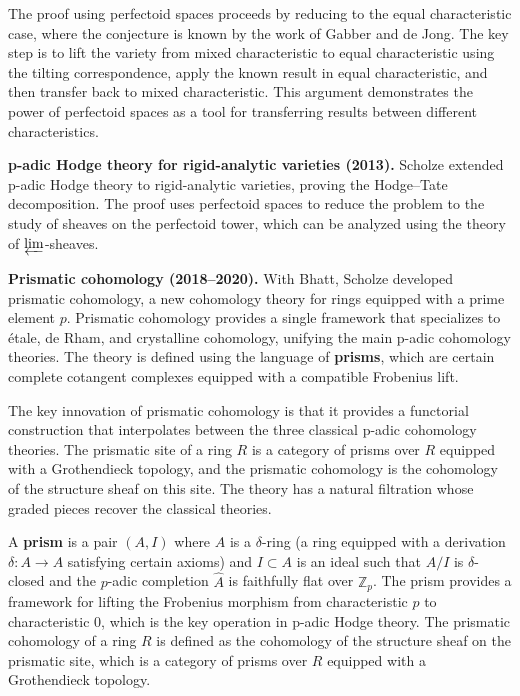 The proof using perfectoid spaces proceeds by reducing to the equal characteristic case, where the conjecture is known by the work of Gabber and de Jong. The key step is to lift the variety from mixed characteristic to equal characteristic using the tilting correspondence, apply the known result in equal characteristic, and then transfer back to mixed characteristic. This argument demonstrates the power of perfectoid spaces as a tool for transferring results between different characteristics.

\textbf{p-adic Hodge theory for rigid-analytic varieties (2013).} Scholze extended p-adic Hodge theory to rigid-analytic varieties, proving the Hodge--Tate decomposition. The proof uses perfectoid spaces to reduce the problem to the study of sheaves on the perfectoid tower, which can be analyzed using the theory of $\varprojlim$-sheaves.

\textbf{Prismatic cohomology (2018--2020).} With Bhatt, Scholze developed prismatic cohomology, a new cohomology theory for rings equipped with a prime element $p$. Prismatic cohomology provides a single framework that specializes to \'{e}tale, de Rham, and crystalline cohomology, unifying the main p-adic cohomology theories. The theory is defined using the language of \textbf{prisms}, which are certain complete cotangent complexes equipped with a compatible Frobenius lift.

The key innovation of prismatic cohomology is that it provides a functorial construction that interpolates between the three classical p-adic cohomology theories. The prismatic site of a ring $R$ is a category of prisms over $R$ equipped with a Grothendieck topology, and the prismatic cohomology is the cohomology of the structure sheaf on this site. The theory has a natural filtration whose graded pieces recover the classical theories.

A \textbf{prism} is a pair $(A, I)$ where $A$ is a $\delta$-ring (a ring equipped with a derivation $\delta: A \to A$ satisfying certain axioms) and $I \subset A$ is an ideal such that $A/I$ is $\delta$-closed and the $p$-adic completion $\widehat{A}$ is faithfully flat over $\mathbb{Z}_p$. The prism provides a framework for lifting the Frobenius morphism from characteristic $p$ to characteristic 0, which is the key operation in p-adic Hodge theory. The prismatic cohomology of a ring $R$ is defined as the cohomology of the structure sheaf on the prismatic site, which is a category of prisms over $R$ equipped with a Grothendieck topology.

